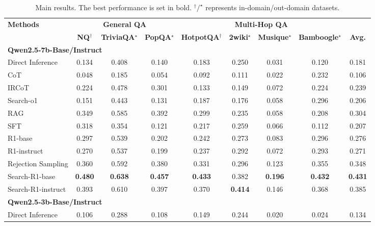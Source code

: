 \begin{table}[t]
    \centering
    \scriptsize
    \setlength{\tabcolsep}{4pt}
    
    \caption{Main results. The best performance is set in bold. $^\dagger/^\star$ represents in-domain/out-domain datasets.}\label{tab:main}
    \begin{tabular}{lcccccccc}
        \toprule
        \textbf{Methods} & \multicolumn{3}{c}{\textbf{General QA}} & \multicolumn{4}{c}{\textbf{Multi-Hop QA}} \\
        \cmidrule{2-9}
         & \textbf{NQ$^\dagger$} & \textbf{TriviaQA$^\star$} & \textbf{PopQA$^\star$} & \textbf{HotpotQA$^\dagger$} & \textbf{2wiki$^\star$} & \textbf{Musique$^\star$} & \textbf{Bamboogle$^\star$} & \textbf{Avg.} \\
        \midrule
        \multicolumn{8}{l}{\textbf{Qwen2.5-7b-Base/Instruct}} \\
        Direct Inference & 0.134 & 0.408 & 0.140 & 0.183 & 0.250 & 0.031 & 0.120 & 0.181 \\
        CoT & 0.048 & 0.185 & 0.054 & 0.092 & 0.111 & 0.022 & 0.232 & 0.106 \\
        IRCoT & 0.224 & 0.478 & 0.301 & 0.133 & 0.149 & 0.072 & 0.224 & 0.239 \\
        Search-o1 & 0.151 & 0.443 & 0.131 & 0.187 & 0.176 & 0.058 & 0.296 & 0.206 \\
        RAG & 0.349 & 0.585 & 0.392 & 0.299 & 0.235 & 0.058 & 0.208 & 0.304 \\
        SFT & 0.318 & 0.354 & 0.121 & 0.217 & 0.259 & 0.066 & 0.112 & 0.207  \\
        R1-base & 0.297 & 0.539 & 0.202 & 0.242 & 0.273 & 0.083 & 0.296 & 0.276  \\
        R1-instruct & 0.270 & 0.537 & 0.199 & 0.237 & 0.292 & 0.072 & 0.293 & 0.271  \\
        Rejection Sampling & 0.360 & 0.592 & 0.380 & 0.331 & 0.296 & 0.123 & 0.355 & 0.348 \\
        \hdashline
        Search-R1-base & \textbf{0.480} & \textbf{0.638} & \textbf{0.457} & \textbf{0.433} & 0.382 & \textbf{0.196} & \textbf{0.432} & \textbf{0.431}  \\
        Search-R1-instruct & 0.393 & 0.610 & 0.397 & 0.370 & \textbf{0.414} & 0.146 & 0.368 & 0.385 \\
        \midrule
        \multicolumn{8}{l}{\textbf{Qwen2.5-3b-Base/Instruct}} \\
        Direct Inference & 0.106 & 0.288 & 0.108 & 0.149 & 0.244 & 0.020 & 0.024 & 0.134 \\

\end{tabular}
\end{table}
